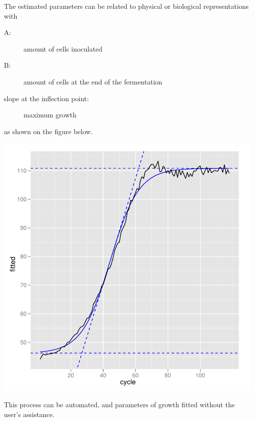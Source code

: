 \documentclass[a4paper,twoside]{article}
\begin{document}
The estimated parameters can be related to physical or biological representations with
\begin{description}
  \item[A:] amount of cells inoculated
  \item[B:] amount of cells at the end of the fermentation
  \item[slope at the inflection point:] maximum growth
\end{description}
as shown on the figure below.

\includegraphics{htmf-010}




This process can be automated, and parameters of growth fitted without the user's assistance.
\end{document}
